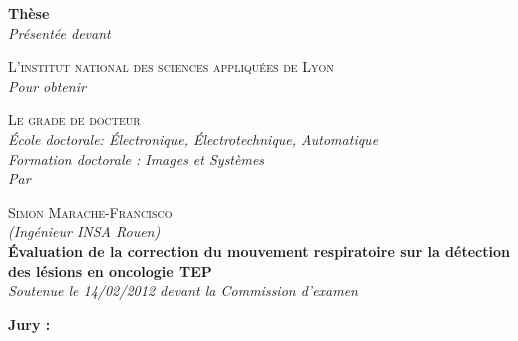 \begin{titlepage}

\begin{center}





\textbf{\Large Thèse}\\[0.5cm]

\textsl{\large Présentée devant}

\textsc{\large L’institut national des sciences appliquées de Lyon}\\[1.5cm]

\textsl{\large Pour obtenir}

\textsc{\large Le grade de docteur}\\[1.5cm]

\textsl{\large École doctorale: \'Electronique, \'Electrotechnique, Automatique}\\%
\textsl{\large Formation doctorale : Images et Systèmes}\\[1cm]
\textsl{\large Par}

\textsc{\large Simon Marache-Francisco}\\\textsl{(Ingénieur INSA Rouen)}\\[1.5cm]

\textbf{\LARGE \'Evaluation de la correction du mouvement respiratoire sur la détection des lésions en oncologie TEP}\\[1.5cm]

\textsl{\large Soutenue le 14/02/2012 devant la Commission d’examen}\\[1cm]

\vfill 

\begin{flushleft} \textbf{\Large Jury :} \end{flushleft}


\end{center}
\end{titlepage}
